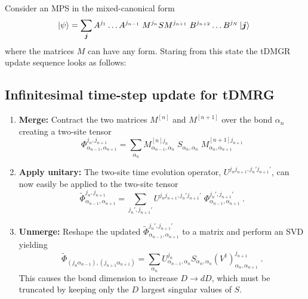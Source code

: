 Consider an MPS in the mixed-canonical form
\begin{equation}
	\ket{\psi} = \sum_{\boldsymbol{j}} A^{j_1} \ldots A^{j_{n-1}} \; M^{j_n} S M^{j_{n+1}} \; B^{j_{n+2}} \ldots B^{j_N} \ket{\boldsymbol{j}} \;
\end{equation}
where the matrices $M$ can have any form. Staring from this state the tDMGR update sequence looks as follows:

\subsection{Infinitesimal time-step update for tDMRG}
\begin{enumerate}
\item
\textbf{Merge:} Contract the two matrices $M^{[n]}$ and $M^{[n+1]}$ over the bond $\alpha_{n}$ creating a two-site tensor
\begin{equation}
	\Phi_{\alpha_{n-1} , \alpha_{n+1}}^{j_n , j_{n+1}} = \sum_{\alpha_n} M_{\alpha_{n-1} , \alpha_{n}}^{[n] j_n } \; S_{\alpha_{n} , \alpha_{n}} \;  M_{\alpha_{n} , \alpha_{n+1}}^{[n+1] j_{n+1} } 
\end{equation}


\item
\textbf{Apply unitary:} The two-site time evolution operator, $U^{j_n  j_{n+1} , j_n '  j_{n+1}'}$, can now easily be applied to the two-site tensor
\begin{equation}
	\tilde{\Phi}_{\alpha_{n-1} , \alpha_{n+1}}^{j_n , j_{n+1} } = \sum_{j_n ', j_{n+1}'} U^{j_n  j_{n+1} , j_n '  j_{n+1}'} \; \Phi_{\alpha_{n-1} , \alpha_{n+1}}^{j_n ', j_{n+1} ' } \; .
\end{equation}


\item
\textbf{Unmerge:} Reshape the updated $\tilde{\Phi}_{\alpha_{n-1} , \alpha_{n+1}}^{j_n ', j_{n+1} '}$ to a matrix and perform an SVD yielding
\begin{equation}
	\tilde{\Phi}_{(j_n  \alpha_{n-1} ) ,(j_{n+1}  \alpha_{n+1})} = \sum_{\alpha_n} U_{\alpha_{n-1} , \alpha_{n}}^{j_n } S_{\alpha_n , \alpha_n} (V^{\dag})_{\alpha_{n} , \alpha_{n+1}}^{j_{n+1} } \; .
\end{equation}
This causes the bond dimension to increase $D \rightarrow d D$, which must be truncated by keeping only the $D$ largest singular values of $S$. 



\end{enumerate}
